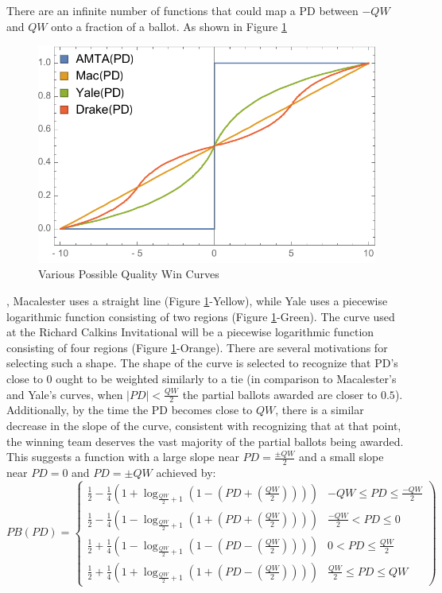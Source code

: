 \documentclass{article}
\begin{document}
There are an infinite number of functions that could map a PD between $-QW$ and $QW$ onto a fraction of a ballot.  As shown in Figure \ref{ballotCurves}
\begin{figure}[h]
\centering
\caption{Various Possible Quality Win Curves}
\label{ballotCurves}
\includegraphics[width=0.8\linewidth]{BallotCurve}
\end{figure}
, Macalester uses a straight line (Figure \ref{ballotCurves}-Yellow), while Yale uses a piecewise logarithmic function consisting of two regions (Figure \ref{ballotCurves}-Green).  The curve used at the Richard Calkins Invitational will be a piecewise logarithmic function consisting of four regions (Figure \ref{ballotCurves}-Orange).  There are several motivations for selecting such a shape.  The shape of the curve is selected to recognize that PD's close to 0 ought to be weighted similarly to a tie (in comparison to Macalester's and Yale's curves, when $|PD|<\frac{QW}{2}$ the partial ballots awarded are closer to $0.5$).  Additionally, by the time the PD becomes close to $QW$, there is a similar decrease in the slope of the curve, consistent with recognizing that at that point, the winning team deserves the vast majority of the partial ballots being awarded.  This suggests a function with a large slope near $PD=\frac{\pm QW}{2}$ and a small slope near $PD=0$ and $PD=\pm QW$ achieved by:\\
\begin{displaymath}
   PB(PD) = \left\{
     \begin{array}{lr}
       \frac{1}{2}-\frac{1}{4}\left(1+\log_{\frac{QW}{2}+1}\left(1-\left(PD+\left(\frac{QW}{2}\right)\right)\right)\right) &  -QW\le PD\le \frac{-QW}{2}\\
       \frac{1}{2}-\frac{1}{4}\left(1-\log_{\frac{QW}{2}+1}\left(1+\left(PD+\left(\frac{QW}{2}\right)\right)\right)\right) &  \frac{-QW}{2}<PD\le 0\\
       \frac{1}{2}+\frac{1}{4}\left(1-\log_{\frac{QW}{2}+1}\left(1-\left(PD-\left(\frac{QW}{2}\right)\right)\right)\right) &  0<PD\le\frac{QW}{2}\\
       \frac{1}{2}+\frac{1}{4}\left(1+\log_{\frac{QW}{2}+1}\left(1+\left(PD-\left(\frac{QW}{2}\right)\right)\right)\right) & \frac{QW}{2}\le PD \le QW
     \end{array}
  \right)
\end{displaymath}
\end{document}
